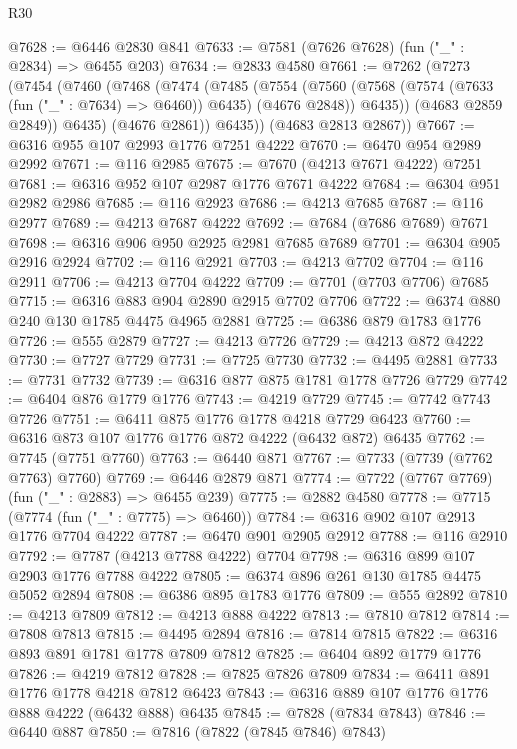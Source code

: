 \begin{lexlean}{R30}
\begin{coremodule}
@7628 := @6446 @2830 @841
@7633 := @7581 (@7626 @7628) (fun ("_" : @2834) => @6455 @203)
@7634 := @2833 @4580
@7661 := @7262
    (@7273
      (@7454
        (@7460
          (@7468
            (@7474
              (@7485
                (@7554
                  (@7560
                    (@7568 (@7574 (@7633 (fun ("_" : @7634) => @6460)) @6435) (@4676 @2848))
                    @6435))
                (@4683 @2859 @2849))
              @6435)
            (@4676 @2861))
          @6435))
      (@4683 @2813 @2867))
@7667 := @6316 @955 @107 @2993 @1776 @7251 @4222
@7670 := @6470 @954 @2989 @2992
@7671 := @116 @2985
@7675 := @7670 (@4213 @7671 @4222) @7251
@7681 := @6316 @952 @107 @2987 @1776 @7671 @4222
@7684 := @6304 @951 @2982 @2986
@7685 := @116 @2923
@7686 := @4213 @7685
@7687 := @116 @2977
@7689 := @4213 @7687 @4222
@7692 := @7684 (@7686 @7689) @7671
@7698 := @6316 @906 @950 @2925 @2981 @7685 @7689
@7701 := @6304 @905 @2916 @2924
@7702 := @116 @2921
@7703 := @4213 @7702
@7704 := @116 @2911
@7706 := @4213 @7704 @4222
@7709 := @7701 (@7703 @7706) @7685
@7715 := @6316 @883 @904 @2890 @2915 @7702 @7706
@7722 := @6374 @880 @240 @130 @1785 @4475 @4965 @2881
@7725 := @6386 @879 @1783 @1776
@7726 := @555 @2879
@7727 := @4213 @7726
@7729 := @4213 @872 @4222
@7730 := @7727 @7729
@7731 := @7725 @7730
@7732 := @4495 @2881
@7733 := @7731 @7732
@7739 := @6316 @877 @875 @1781 @1778 @7726 @7729
@7742 := @6404 @876 @1779 @1776
@7743 := @4219 @7729
@7745 := @7742 @7743 @7726
@7751 := @6411 @875 @1776 @1778 @4218 @7729 @6423
@7760 := @6316 @873 @107 @1776 @1776 @872 @4222 (@6432 @872) @6435
@7762 := @7745 (@7751 @7760)
@7763 := @6440 @871
@7767 := @7733 (@7739 (@7762 @7763) @7760)
@7769 := @6446 @2879 @871
@7774 := @7722 (@7767 @7769) (fun ("_" : @2883) => @6455 @239)
@7775 := @2882 @4580
@7778 := @7715 (@7774 (fun ("_" : @7775) => @6460))
@7784 := @6316 @902 @107 @2913 @1776 @7704 @4222
@7787 := @6470 @901 @2905 @2912
@7788 := @116 @2910
@7792 := @7787 (@4213 @7788 @4222) @7704
@7798 := @6316 @899 @107 @2903 @1776 @7788 @4222
@7805 := @6374 @896 @261 @130 @1785 @4475 @5052 @2894
@7808 := @6386 @895 @1783 @1776
@7809 := @555 @2892
@7810 := @4213 @7809
@7812 := @4213 @888 @4222
@7813 := @7810 @7812
@7814 := @7808 @7813
@7815 := @4495 @2894
@7816 := @7814 @7815
@7822 := @6316 @893 @891 @1781 @1778 @7809 @7812
@7825 := @6404 @892 @1779 @1776
@7826 := @4219 @7812
@7828 := @7825 @7826 @7809
@7834 := @6411 @891 @1776 @1778 @4218 @7812 @6423
@7843 := @6316 @889 @107 @1776 @1776 @888 @4222 (@6432 @888) @6435
@7845 := @7828 (@7834 @7843)
@7846 := @6440 @887
@7850 := @7816 (@7822 (@7845 @7846) @7843)

\end{coremodule}
\end{lexlean}
